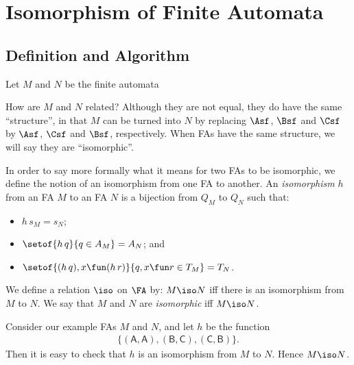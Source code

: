 \section{Isomorphism of Finite Automata}
\label{IsomorphismOfFiniteAutomata}

\subsection{Definition and Algorithm}

%
%
Let $M$ and $N$ be the finite automata
\begin{center}

\end{center}
How are $M$ and $N$ related?
Although they are not equal, they do have the same
``structure'', in that $M$ can be turned into $N$ by replacing
$\Asf$, $\Bsf$ and $\Csf$ by $\Asf$, $\Csf$ and $\Bsf$, respectively.
When FAs have the same structure, we will say they are ``isomorphic''.

In order to say more formally what it means for two FAs to be
isomorphic, we define the notion of an isomorphism from one FA to
another.  An {\em isomorphism}
%
%
$h$ from an FA $M$ to an FA $N$ is a bijection from $Q_M$ to $Q_N$
such that:
\begin{itemize}
\item $h\,s_M = s_N$;

\item $\setof{h\,q}{q\in A_M} = A_N$; and

\item $\setof{(h\,q), x\fun (h\,r)}{q,x\fun r\in T_M} =
T_N$.
\end{itemize}
We define a relation $\iso$ on $\FA$ by: $M\iso N$
%
%
%
iff there
is an isomorphism from $M$ to $N$.  We say that $M$ and $N$ are
{\em isomorphic\/}
%
%
%
iff $M\iso N$.

Consider our example FAs $M$ and $N$, and
let $h$ be the function
\begin{gather*}
\mathsf{\{(A, A), (B, C), (C, B)\}}.
\end{gather*}
Then it is easy to check that $h$ is an isomorphism from $M$ to $N$.
Hence $M\iso N$.

